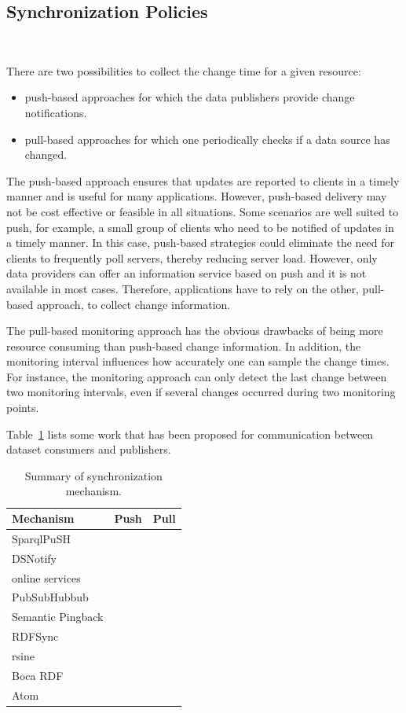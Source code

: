 \documentclass[sw]{iosart2x}
\newcommand{\cmark}{\ding{51}}%
\begin{document}
\subsection{Synchronization Policies}\label{Synchronization}
~\cite{UmbrichHHPD10}

There are two possibilities to collect the change time for a given resource:
\begin{itemize}
	\item push-based approaches for which the data publishers provide change notifications.
	\item pull-based approaches for which one periodically checks if a data source has changed.
\end{itemize}

The push-based approach ensures that updates are reported to clients in a timely manner and is useful for many applications. However, push-based delivery may not be cost effective or feasible in all situations. Some scenarios are well suited to push, for example, a small group of clients who need to be notified of updates in a timely manner. In this case, push-based strategies could eliminate the need for clients to frequently poll servers, thereby reducing server load. However, only data providers can offer an information service based on push and it is not available in most cases. Therefore, applications have to rely on the other, pull-based approach, to collect change information. 

The pull-based monitoring approach has the obvious drawbacks of being more resource consuming than push-based change information. In addition, the monitoring interval influences how accurately one can sample the change times. For instance, the monitoring approach can only detect the last change between two monitoring intervals, even if several changes occurred during two monitoring points.

Table~\ref{tab:syn} lists some work that has been proposed for communication between dataset consumers and publishers.

\begin{table}[htbp]
	\centering
	\caption{Summary of synchronization mechanism.}
	\begin{tabular}{lcc}
		\hline
		Mechanism & Push & Pull \\ \hline
		SparqlPuSH \cite{PassantM10} & \cmark   & \\
		DSNotify \cite{PopitschH11} &   & \cmark \\
		online services\footnotemark & \cmark   & \\
		PubSubHubbub \cite{Fitzpatrick10} & \cmark   & \\
		Semantic Pingback \cite{TrampFEA10} & \cmark   & \\
		RDFSync \cite{TummarelloMBE07} &   &  \cmark  \\
		rsine \cite{MaderMS14} & \cmark   & \\
		Boca RDF \cite{MissierACDG07} & \cmark   & \\
		Atom \cite{Nottingham05} &    &  \cmark \\
		\hline
	\end{tabular}%
	\label{tab:syn}%
\end{table}%
\end{document}
